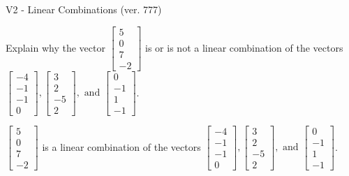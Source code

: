 \begin{exercise}
  \begin{exerciseTitle}V2 - Linear Combinations (ver. 777)\end{exerciseTitle}
  \begin{exerciseStatement}
    Explain why the vector \(\left[\begin{array}{c}
5 \\
0 \\
7 \\
-2
\end{array}\right]\)  is or is not a linear 
	combination of the vectors \(\left[\begin{array}{c}
-4 \\
-1 \\
-1 \\
0
\end{array}\right] , \left[\begin{array}{c}
3 \\
2 \\
-5 \\
2
\end{array}\right] , \text{ and } \left[\begin{array}{c}
0 \\
-1 \\
1 \\
-1
\end{array}\right]\).
	


  \end{exerciseStatement}
  \begin{exerciseAnswer}
   \(\left[\begin{array}{c}
5 \\
0 \\
7 \\
-2
\end{array}\right]\) 
  	 is  
	a linear combination of the vectors \(\left[\begin{array}{c}
-4 \\
-1 \\
-1 \\
0
\end{array}\right] , \left[\begin{array}{c}
3 \\
2 \\
-5 \\
2
\end{array}\right] , \text{ and } \left[\begin{array}{c}
0 \\
-1 \\
1 \\
-1
\end{array}\right]\).

	
  


  \end{exerciseAnswer}
\end{exercise}